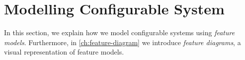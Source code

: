 \section{Modelling Configurable System}\label{ch:modelling-configsys}

In this section, we explain how we model configurable systems using \emph{feature models}. 
Furthermore, in \autoref{ch:feature-diagram} we introduce \emph{feature diagrams}, a visual representation of feature models.


